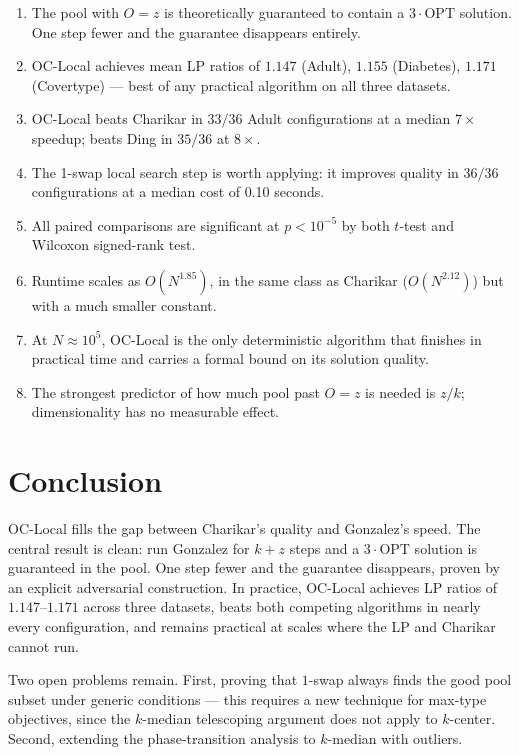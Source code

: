 \documentclass[11pt]{article}
\begin{document}
\begin{enumerate}
    \item The pool with $O = z$ is theoretically guaranteed to contain a $3 \cdot \mathrm{OPT}$ solution. One step fewer and the guarantee disappears entirely.
    \item OC-Local achieves mean LP ratios of $1.147$ (Adult), $1.155$ (Diabetes), $1.171$ (Covertype) --- best of any practical algorithm on all three datasets.
    \item OC-Local beats Charikar in $33/36$ Adult configurations at a median $7\times$ speedup; beats Ding in $35/36$ at $8\times$.
    \item The 1-swap local search step is worth applying: it improves quality in $36/36$ configurations at a median cost of 0.10 seconds.
    \item All paired comparisons are significant at $p < 10^{-5}$ by both $t$-test and Wilcoxon signed-rank test.
    \item Runtime scales as $O(N^{1.85})$, in the same class as Charikar ($O(N^{2.12})$) but with a much smaller constant.
    \item At $N \approx 10^5$, OC-Local is the only deterministic algorithm that finishes in practical time and carries a formal bound on its solution quality.
    \item The strongest predictor of how much pool past $O = z$ is needed is $z/k$; dimensionality has no measurable effect.
\end{enumerate}


\section{Conclusion}

OC-Local fills the gap between Charikar's quality and Gonzalez's speed. The central result is clean: run Gonzalez for $k + z$ steps and a $3 \cdot \mathrm{OPT}$ solution is guaranteed in the pool. One step fewer and the guarantee disappears, proven by an explicit adversarial construction. In practice, OC-Local achieves LP ratios of $1.147$--$1.171$ across three datasets, beats both competing algorithms in nearly every configuration, and remains practical at scales where the LP and Charikar cannot run.

Two open problems remain. First, proving that $1$-swap always finds the good pool subset under generic conditions --- this requires a new technique for max-type objectives, since the $k$-median telescoping argument does not apply to $k$-center. Second, extending the phase-transition analysis to $k$-median with outliers.
\end{document}
